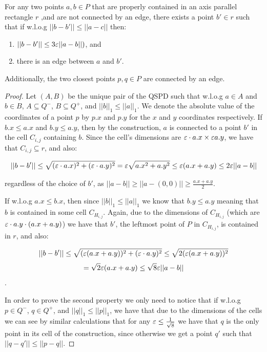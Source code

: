 \documentclass[12pt]{article}%
\begin{document}
\begin{claim}
	\label{clm:span_properties}
	For any two points $a,b\in P$ that are properly contained in an axis parallel rectangle $r$ ,and are not connected by an edge, there exists a point $b'\in r$ such that if w.l.o.g $||b-b'|| \leq ||a-c||$ then:
	\begin{enumerate}
		\item $||b-b'|| \leq 3\varepsilon ||a-b||)$, and
		\item there is an edge between $a$ and $b'$. 
	\end{enumerate}
	Additionally, the two closest points $p,q\in P$ are connected by an edge.
	
\end{claim}

\begin{proof}
	Let $(A,B)$ be the unique pair of the QSPD such that w.l.o.g $a\in A$ and $b\in B$, $A\subseteq Q^-$, $B\subseteq Q^+$, and $||b||_{1} \leq ||a||_{1}$. We denote the absolute value of the coordinates of a point $p$ by $p.x$ and $p.y$ for the $x$ and $y$ coordinates respectively. If $b.x \leq a.x$ and $b.y \leq a.y$, then by the construction, $a$ is connected to a point $b'$ in the cell $C_{i,j}$ containing $b$. Since the cell's dimensions are $\varepsilon\cdot a.x \times \varepsilon a.y$, we have that $C_{i,j}\subseteq r$, and also:
	
	$$||b-b'||\leq \sqrt{(\varepsilon\cdot a.x)^2+(\varepsilon\cdot a.y)^2}=\varepsilon\sqrt{a.x^2+a.y^2}\leq \varepsilon(a.x+a.y) \leq 2\varepsilon||a-b||$$
	
	regardless of the choice of $b'$, as $||a-b||\geq||a-(0,0)||\geq \frac{a.x+a.y}{2}$. 
	
	If w.l.o.g $a.x\leq b.x$, then since $||b||_{1} \leq ||a||_{1}$ we know that $b.y \leq a.y$ meaning that $b$ is contained in some cell $C_{H_{i,j}}$. Again, due to the dimensions of $C_{H_{i,j}}$ (which are $\eps\cdot a.y \time \eps\cdot(a.x+a.y)$) we have that $b'$, the leftmost point of $P$ in $C_{H_{i,j}}$, is contained in $r$, and also:
	
	$$||b-b'||\leq \sqrt{(\varepsilon (a.x+a.y))^2+(\varepsilon\cdot a.y)^2}\leq \sqrt{2(\varepsilon (a.x+a.y))^2} $$
	$$=\sqrt{2}\varepsilon(a.x+a.y) \leq \sqrt{8}\varepsilon||a-b||$$.
	
	In order to prove the second property we only need to notice that if w.l.o.g $p\in Q^-$, $q\in Q^+$, and $||q||_1\leq ||p||_1$, we have that due to the dimensions of the cells we can see by similar calculations that for any $\varepsilon\leq \frac{1}{\sqrt{8}}$ we have that $q$ is the only point in its cell of the construction, since otherwise we get a point $q'$ such that $||q-q'||\leq ||p-q||$.
	
\end{proof}
\end{document}
